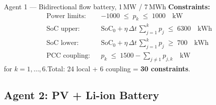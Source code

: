 \documentclass[11pt, letterpaper]{article}
\newcommand{\Dt}{\Delta t}
\begin{document}
\begin{agentbox}{Agent 1 — Bidirectional flow battery, 1\,MW / 7\,MWh}
\textbf{Constraints:}
\begin{align*}
  &\text{Power limits:}   && -1000 \;\le\; p_k \;\le\; 1000 \quad\text{kW} \\
  &\text{SoC upper:}      && \text{SoC}_0 + \eta\,\Dt\,\textstyle\sum_{j=1}^k p_j \;\le\; 6300 \quad\text{kWh} \\
  &\text{SoC lower:}      && \text{SoC}_0 + \eta\,\Dt\,\textstyle\sum_{j=1}^k p_j \;\ge\; 700  \quad\text{kWh} \\
  &\text{PCC coupling:}   && p_k \;\le\; 1500 - \textstyle\sum_{j\ne 1} p_{j,k} \quad\text{kW}
\end{align*}
for $k = 1,\ldots,6$.\quad Total: 24 local + 6 coupling = \textbf{30 constraints}.

\end{agentbox}

\subsection{Agent 2: PV + Li-ion Battery}
\end{document}

